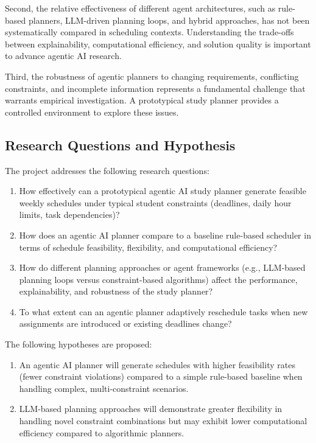 \documentclass[12pt]{article}
\begin{document}
Second, the relative effectiveness of different agent architectures, such as rule-based planners, LLM-driven planning loops, and hybrid approaches, has not been systematically compared in scheduling contexts.
Understanding the trade-offs between explainability, computational efficiency, and solution quality is important to advance agentic AI research.

Third, the robustness of agentic planners to changing requirements, conflicting constraints, and incomplete information represents a fundamental challenge that warrants empirical investigation. A prototypical study planner provides a controlled environment to explore these issues.

\subsection{Research Questions and Hypothesis}
The project addresses the following research questions:
\begin{enumerate}
\item How effectively can a prototypical agentic AI study planner generate feasible weekly schedules under typical student constraints (deadlines, daily hour limits, task dependencies)?

\item How does an agentic AI planner compare to a baseline rule-based scheduler in terms of schedule feasibility, flexibility, and computational efficiency?

\item How do different planning approaches or agent frameworks (e.g., LLM-based planning loops versus constraint-based algorithms) affect the performance, explainability, and robustness of the study planner?

\item To what extent can an agentic planner adaptively reschedule tasks when new assignments are introduced or existing deadlines change?
\end{enumerate}

The following hypotheses are proposed:

\begin{enumerate}
    \item An agentic AI planner will generate schedules with higher feasibility rates (fewer constraint violations) compared to a simple rule-based baseline when handling complex, multi-constraint scenarios.
    \item LLM-based planning approaches will demonstrate greater flexibility in handling novel constraint combinations but may exhibit lower computational efficiency compared to algorithmic planners.
\end{enumerate}
\end{document}
